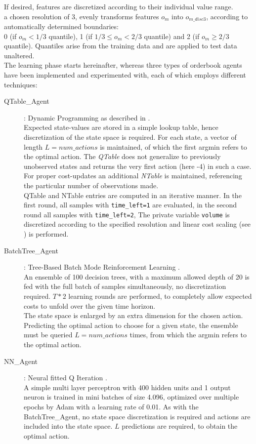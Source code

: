 If desired, features are discretized according to their individual value range.\\
\Eg a chosen resolution of 3, evenly transforms features $o_m$ into $o_{m\_disc3}$, according to automatically determined boundaries: \\
0 (if $o_m< 1/3$ quantile), 1 (if $1/3 \leq o_m < 2/3$ quantile) and 2 (if $o_m \geq 2/3$ quantile). Quantiles arise from the training data and are applied to test data unaltered.\\

The learning phase starts hereinafter, whereas three types of orderbook agents have been implemented and experimented with, each of which employs different techniques:

\begin{description}
\item[QTable\_Agent] : Dynamic Programming as described in .\\
Expected state-values are stored in a simple lookup table, hence discretization of the state space is required. For each state, a vector of length $L=num\_actions$ is maintained, of which the first argmin refers to the optimal action. The \emph{QTable} does not generalize to previously unobserved states and returns the very first action (here -4) in such a case. For proper cost-updates an additional \emph{NTable} is maintained, referencing the particular number of observations made.\\
QTable and NTable entries are computed in an iterative manner. In the first round, all samples with \lstinline!time_left=1! are evaluated, in the second round all samples with \lstinline!time_left=2!, \etc The private variable \lstinline!volume! is discretized according to the specified resolution and linear cost scaling (see ) is performed.

\item[BatchTree\_Agent]: Tree-Based Batch Mode Reinforcement Learning \Cite{Ernst:2005:TreeBasedBatchModeRL}.\\
An ensemble of 100 decision trees, with a maximum allowed depth of 20 is fed with the full batch of samples simultaneously, no discretization required. $T*2$ learning rounds are performed, to completely allow expected costs to unfold over the given time horizon.\\
The state space is enlarged by an extra dimension for the chosen action. Predicting the optimal action to choose for a given state, the ensemble must be queried $L=num\_actions$ times, from which the argmin refers to the optimal action.

\item[NN\_Agent] : Neural fitted Q Iteration \Cite{Riedmiller:2005:NFQ}.\\
A simple multi layer perceptron with 400 hidden units and 1 output neuron is trained in mini batches of size 4.096, optimized over multiple epochs by Adam\Cite{Kingma:2014:Adam} with a learning rate of 0.01. As with the BatchTree\_Agent, no state space discretization is required and actions are included into the state space. $L$ predictions are required, to obtain the optimal action.
\end{description}
